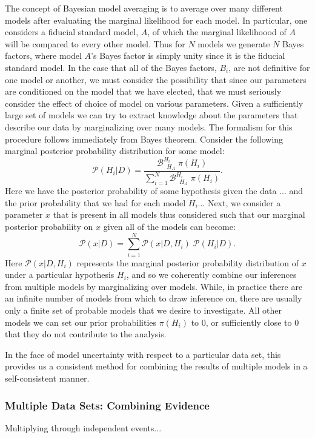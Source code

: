 The concept of Bayesian model averaging is to average over many different models after evaluating the marginal likelihood for each model. In particular, one considers a fiducial standard model, $A$, of which the marginal likelihoood of $A$ will be compared to every other model. Thus for $N$ models we generate $N$ Bayes factors, where model $A$'s Bayes factor is simply unity since it is the fiducial standard model. In the case that all of the Bayes factors, $B_i$, are not definitive for one model or another, we must consider the possibility that since our parameters are conditioned on the model that we have elected, that we must seriously consider the effect of choice of model on various parameters. Given a sufficiently large set of models we can try to extract knowledge about the parameters that describe our data by marginalizing over many models. The formalism for this procedure follows immediately from Bayes theorem. Consider the following marginal posterior probability distribution for some model:
\begin{equation}
    \mathcal{P}(H_i|D) = \frac{\mathcal{B}^{H_i\;\;}_{\;\;H_A} \; \pi(H_i)}{\sum_{i=1}^N \mathcal{B}^{H_i\;\;}_{\;\;H_A} \; \pi(H_i)}.
\end{equation}
Here we have the posterior probability of some hypothesis given the data ... and the prior probability that we had for each model $H_i$...
Next, we consider a parameter $x$ that is present in all models thus considered such that our marginal posterior probability on $x$ given all of the models can become:
\begin{equation}
    \mathcal{P}(x|D) = \sum_{i=1}^N \mathcal{P}(x| D, H_i) \; \mathcal{P}(H_i|D).
\end{equation}
Here $\mathcal{P}(x| D, H_i)$ represents the marginal posterior probability distribution of $x$ under a particular hypothesis $H_i$, and so we coherently combine our inferences from multiple models by marginalizing over models. While, in practice there are an infinite number of models from which to draw inference on, there are usually only a finite set of probable models that we desire to investigate. All other models we can set our prior probabilities $\pi(H_i)$ to $0$, or sufficiently close to $0$ that they do not contribute to the analysis.

In the face of model uncertainty with respect to a particular data set, this provides us a consistent method for combining the results of multiple models in a self-consistent manner.

\subsubsection{Multiple Data Sets: Combining Evidence}
Multiplying through independent events...


